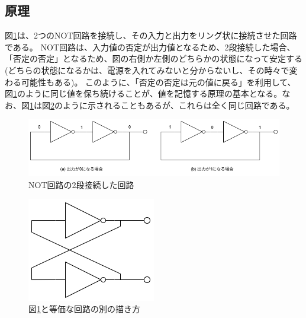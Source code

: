 \documentclass[uplatex, a4j, dvipdfmx]{jsarticle}
\begin{document}
\subsection{原理}
図\ref{E8}は、2つのNOT回路を接続し、その入力と出力をリング状に接続させた回路である。
NOT回路は、入力値の否定が出力値となるため、2段接続した場合、「否定の否定」となるため、図の右側か左側のどちらかの状態になって安定する(どちらの状態になるかは、電源を入れてみないと分からないし、その時々で変わる可能性もある)。
このように、「否定の否定は元の値に戻る」を利用して、図\ref{E8}のように同じ値を保ち続けることが、値を記憶する原理の基本となる。なお、図\ref{E8}は図\ref{E9}のように示されることもあるが、これらは全く同じ回路である。
\begin{figure}[htbp]
    \centering
    \includegraphics[width=0.7\linewidth]{picture/E8.png}
    \caption{NOT回路の2段接続した回路}
    \label{E8}
\end{figure}
\begin{figure}[htbp]
    \centering
    \includegraphics[width=0.5\linewidth]{picture/E9.png}
    \caption{図\ref{E8}と等価な回路の別の描き方}
    \label{E9}
\end{figure}
\end{document}
